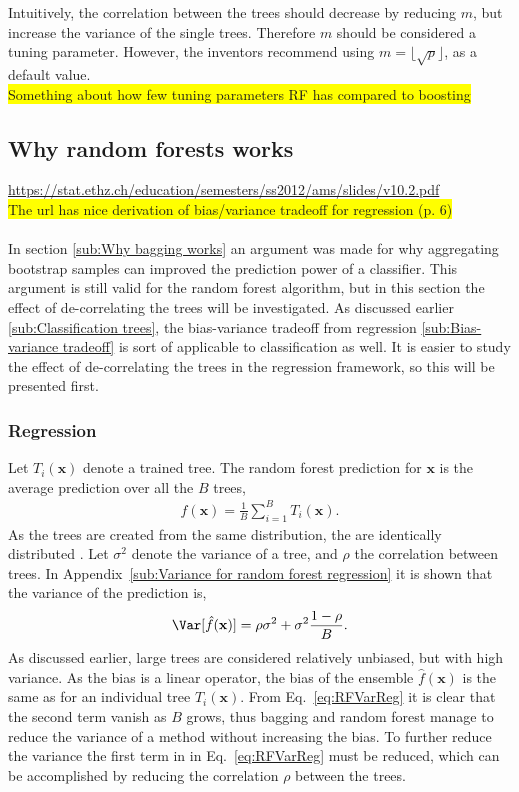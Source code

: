 Intuitively, the correlation between the trees should decrease by reducing $m$, but increase the variance of the single trees. Therefore $m$ should be considered a tuning parameter. However, the inventors recommend using $m = \lfloor \sqrt{p} \rfloor$, as a default value.
\\\colorbox{yellow}{Something about how few tuning parameters RF has compared to boosting}\\

\subsection{Why random forests works}
\label{sub:Why random forests work}
\url{https://stat.ethz.ch/education/semesters/ss2012/ams/slides/v10.2.pdf} \\
\colorbox{yellow}{The url has nice derivation of bias/variance tradeoff for regression (p. 6)}\\
\\
In section \ref{sub:Why bagging works} an argument was made for why aggregating bootstrap samples can improved the prediction power of a classifier. This argument is still valid for the random forest algorithm, but in this section the effect of de-correlating the trees will be investigated. As discussed earlier \ref{sub:Classification trees}, the bias-variance tradeoff from regression \ref{sub:Bias-variance tradeoff} is sort of applicable to classification as well. It is easier to study the effect of de-correlating  the trees in the regression framework, so this will be presented first.

\subsubsection{Regression}
\label{sub:Regression}

Let $T_i(\mathbf{x})$ denote a trained tree. The random forest prediction for $\mathbf{x}$ is the average prediction over all the $B$ trees,
\begin{align}
  \hat f(\mathbf{x}) = \frac{1}{B} \sum_{i = 1}^{B} T_i(\mathbf{x}).
\end{align}
As the trees are created from the same distribution, the are identically distributed . Let $\sigma^2$ denote the variance of a tree, and $\rho$ the correlation between trees. In Appendix~\ref{sub:Variance for random forest regression} it is shown that the variance of the prediction is, 
\begin{align}
\label{eq:RFVarReg} 
  \Var[\hat f(\mathbf{x})] = \rho \sigma^2 + \sigma^2 \frac{1-\rho}{B}.
\end{align}
As discussed earlier, large trees are considered relatively unbiased, but with high variance. As the bias is a linear operator, the bias of the ensemble $\hat f(\mathbf{x})$ is the same as for an individual tree $T_i(\mathbf{x})$. From Eq.~\eqref{eq:RFVarReg} it is clear that the second term vanish as $B$ grows, thus bagging and random forest manage to reduce the variance of a method without increasing the bias. To further reduce the variance the first term in in Eq.~\eqref{eq:RFVarReg} must be reduced, which can be accomplished by reducing the correlation $\rho$ between the trees. 

